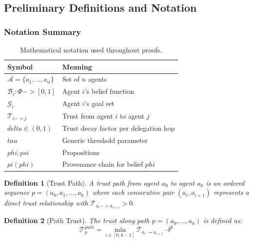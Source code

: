 \documentclass[
]{article}
\newtheorem{definition}{Definition}[section]
\begin{document}
\subsection{Preliminary Definitions and
Notation}\label{sec:preliminaries}

\subsubsection{Notation Summary}\label{sec:notation}

\begin{table}[htbp]
\centering
\caption{Mathematical notation used throughout proofs.}
\label{tab:notation}
\begin{tabular}{@{}ll@{}}
\toprule
Symbol & Meaning \\
\midrule
$\mathcal{A} = \{a_1, \ldots, a_n\}$ & Set of $n$ agents \\
$\mathcal{B}_i: \Phi -> [0,1]$ & Agent $i$'s belief function \\
$\mathcal{G}_i$ & Agent $i$'s goal set \\
$\mathcal{T}_{i -> j}$ & Trust from agent $i$ to agent $j$ \\
$delta \in (0,1)$ & Trust decay factor per delegation hop \\
$tau$ & Generic threshold parameter \\
$phi, psi$ & Propositions \\
$pi(phi)$ & Provenance chain for belief $phi$ \\
\bottomrule
\end{tabular}
\end{table}

\begin{definition}[Trust Path]
\label{def:trust-path}
A trust path from agent $a_0$ to agent $a_k$ is an ordered sequence $p = (a_0, a_1, \ldots, a_k)$ where each consecutive pair $(a_i, a_{i+1})$ represents a direct trust relationship with $\mathcal{T}_{a_i -> a_{i+1}} > 0$.
\end{definition}

\begin{definition}[Path Trust]
\label{def:path-trust}
The trust along path $p = (a_0, \ldots, a_k)$ is defined as:
\begin{equation}
\label{eq:path-trust}
\mathcal{T}^{path}_p = \min_{i \in [0,k-1]} \mathcal{T}_{a_i \to a_{i+1}} \cdot \delta^{k}
\end{equation}
\end{definition}
\end{document}
